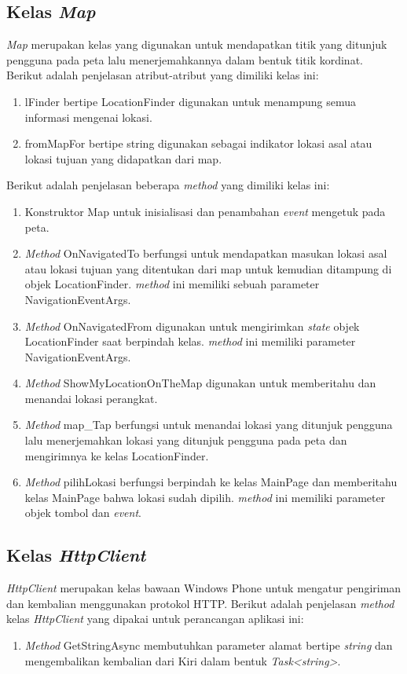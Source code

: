 \subsection{Kelas \textit{Map}}
\label{lab:Kelas Map}
\hspace{0.5cm} \textit{Map} merupakan kelas yang digunakan untuk mendapatkan titik yang ditunjuk pengguna pada peta lalu menerjemahkannya dalam bentuk titik kordinat. Berikut adalah penjelasan atribut-atribut yang dimiliki kelas ini:
\begin{enumerate}
	\item lFinder bertipe LocationFinder digunakan untuk menampung semua informasi mengenai lokasi.
	\item fromMapFor bertipe string digunakan sebagai indikator lokasi asal atau lokasi tujuan yang didapatkan dari map.
\end{enumerate}

Berikut adalah penjelasan beberapa \textit{method} yang dimiliki kelas ini:
\begin{enumerate}
	\item Konstruktor Map untuk inisialisasi dan penambahan \textit{event} mengetuk pada peta.
	\item \textit{Method} OnNavigatedTo berfungsi untuk mendapatkan masukan lokasi asal atau lokasi tujuan yang ditentukan dari map untuk kemudian ditampung di objek LocationFinder. \textit{method} ini memiliki sebuah parameter NavigationEventArgs.
	\item \textit{Method} OnNavigatedFrom digunakan untuk mengirimkan \textit{state} objek LocationFinder saat berpindah kelas. \textit{method} ini memiliki parameter NavigationEventArgs.
	\item \textit{Method} ShowMyLocationOnTheMap digunakan untuk memberitahu dan menandai lokasi perangkat.
	\item \textit{Method} map\_Tap berfungsi untuk menandai lokasi yang ditunjuk pengguna lalu  menerjemahkan lokasi yang ditunjuk pengguna pada peta dan mengirimnya ke kelas LocationFinder.
	\item \textit{Method} pilihLokasi berfungsi berpindah ke kelas MainPage dan memberitahu kelas MainPage bahwa lokasi sudah dipilih. \textit{method} ini memiliki parameter objek tombol dan \textit{event}.
\end{enumerate}

\subsection{Kelas \textit{HttpClient}}
\label{lab:Kelas HttpClient}
\hspace{0.5cm} \textit{HttpClient} merupakan kelas bawaan Windows Phone untuk mengatur pengiriman dan kembalian menggunakan protokol HTTP. Berikut adalah penjelasan \textit{method} kelas \textit{HttpClient} yang dipakai untuk perancangan aplikasi ini:
\begin{enumerate}
	\item \textit{Method} GetStringAsync membutuhkan parameter alamat bertipe \textit{string} dan mengembalikan kembalian dari Kiri dalam bentuk \textit{Task<string>}.
\end{enumerate}

